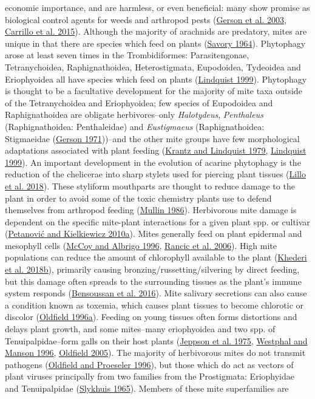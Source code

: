 \documentclass[12pt,final,CPage]{ufthesis}
\begin{document}
{economic importance, and are harmless, or even beneficial: many show promise as biological control agents for weeds and arthropod pests (\protect\hyperlink{ref-Gerson2003}{Gerson et al. 2003}, \protect\hyperlink{ref-Carrillo2015}{Carrillo et al. 2015}). Although the majority of arachnids are predatory, mites are unique in that there are species which feed on plants (\protect\hyperlink{ref-Savory1964}{Savory 1964}). Phytophagy arose at least seven times in the Trombidiformes: Parasitengonae, Tetranychoidea, Raphignathoidea, Heterostigmata, Eupodoidea, Tydeoidea and Eriophyoidea all have species which feed on plants (\protect\hyperlink{ref-Lindquist1999}{Lindquist 1999}). Phytophagy is thought to be a facultative development for the majority of mite taxa outside of the Tetranychoidea and Eriophyoidea; few species of Eupodoidea and Raphignathoidea are obligate herbivores--only \emph{Halotydeus}, \emph{Penthaleus} (Raphignathoidea: Penthaleidae) and \emph{Eustigmaeus} (Raphignathoidea: Stigmaeidae (\protect\hyperlink{ref-Gerson1971}{Gerson 1971}))--and the other mite groups have few morphological adaptations associated with plant feeding (\protect\hyperlink{ref-Krantz1979}{Krantz and Lindquist 1979}, \protect\hyperlink{ref-Lindquist1999}{Lindquist 1999}). An important development in the evolution of acarine phytophagy is the reduction of the chelicerae into sharp stylets used for piercing plant tissues (\protect\hyperlink{ref-Lillo2018}{Lillo et al. 2018}). These styliform mouthparts are thought to reduce damage to the plant in order to avoid some of the toxic chemistry plants use to defend themselves from arthropod feeding (\protect\hyperlink{ref-Brattsten1986}{Mullin 1986}). Herbivorous mite damage is dependent on the specific mite-plant interactions for a given plant spp. or cultivar (\protect\hyperlink{ref-Petanovic2010}{Petanović and Kielkiewicz 2010a}). Mites generally feed on plant epidermal and mesophyll cells (\protect\hyperlink{ref-McCoy1996}{McCoy and Albrigo 1996}, \protect\hyperlink{ref-Rancic2006}{Rancic et al. 2006}). High mite populations can reduce the amount of chlorophyll available to the plant (\protect\hyperlink{ref-Khederi2018a}{Khederi et al. 2018b}), primarily causing bronzing/russetting/silvering by direct feeding, but this damage often spreads to the surrounding tissues as the plant's immune system responds (\protect\hyperlink{ref-Bensoussan2016}{Bensoussan et al. 2016}). Mite salivary secretions can also cause a condition known as toxemia, which causes plant tissues to become chlorotic or discolor (\protect\hyperlink{ref-Oldfield1996}{Oldfield 1996a}). Feeding on young tissues often forms distortions and delays plant growth, and some mites--many eriophyoidea and two spp. of Tenuipalpidae--form galls on their host plants (\protect\hyperlink{ref-Jeppson1975}{Jeppson et al. 1975}, \protect\hyperlink{ref-Westphal1996}{Westphal and Manson 1996}, \protect\hyperlink{ref-Oldfield2005}{Oldfield 2005}). The majority of herbivorous mites do not transmit pathogens (\protect\hyperlink{ref-Oldfield1996a}{Oldfield and Proeseler 1996}), but those which do act as vectors of plant viruses principally from two families from the Prostigmata: Eriophyidae and Tenuipalpidae (\protect\hyperlink{ref-Slykhuis1965}{Slykhuis 1965}). Members of these mite superfamilies are }
\end{document}
